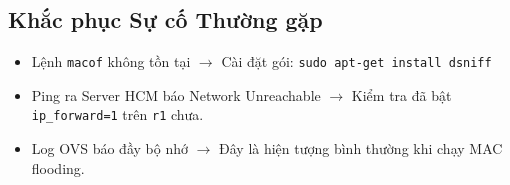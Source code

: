 \subsection{Khắc phục Sự cố Thường gặp}
\begin{itemize}
    \item Lệnh \texttt{macof} không tồn tại $\rightarrow$ Cài đặt gói: \texttt{sudo apt-get install dsniff}
    \item Ping ra Server HCM báo Network Unreachable $\rightarrow$ Kiểm tra đã bật \texttt{ip\_forward=1} trên \texttt{r1} chưa.
    \item Log OVS báo đầy bộ nhớ $\rightarrow$ Đây là hiện tượng bình thường khi chạy MAC flooding.
\end{itemize}